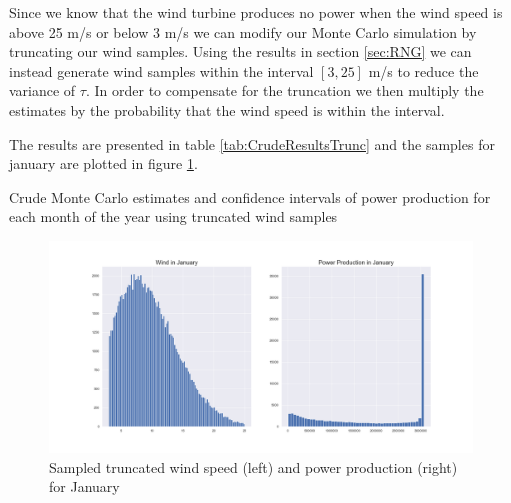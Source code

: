 \documentclass[a4paper]{article}
\begin{document}
Since we know that the wind turbine produces no power when the wind speed is above 25 m/s or below 3 m/s we can modify our Monte Carlo simulation by truncating our wind samples. Using the results in section \ref{sec:RNG} we can instead generate wind samples within the interval $[3,25]$ m/s to reduce the variance of $\tau$. In order to compensate for the truncation we then multiply the estimates by the probability that the wind speed is within the interval.

The results are presented in table \ref{tab:CrudeResultsTrunc} and the samples for january are plotted in figure \ref{fig:samplesJanTrunc}.
\begin{table}[H]
    \centering
    \caption{Crude Monte Carlo estimates and confidence intervals of power production for each month of the year using truncated wind samples}
    \label{tab:CrudeResultsTrunc}
    
\end{table}

\begin{figure}[H]
    \centering
    \includegraphics[width = 1.0\textwidth]{images/janCrudeMCTrunc}
    \caption{Sampled truncated wind speed (left) and power production (right) for January}
    \label{fig:samplesJanTrunc}
\end{figure}
\end{document}
